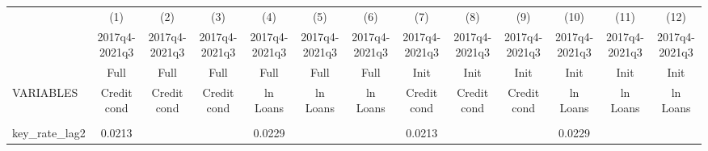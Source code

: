 \documentclass[]{article}
\begin{document}
\begin{center}
\begin{tabular}{lcccccccccccc} \hline
 & (1) & (2) & (3) & (4) & (5) & (6) & (7) & (8) & (9) & (10) & (11) & (12) \\
 & 2017q4-2021q3 & 2017q4-2021q3 & 2017q4-2021q3 & 2017q4-2021q3 & 2017q4-2021q3 & 2017q4-2021q3 & 2017q4-2021q3 & 2017q4-2021q3 & 2017q4-2021q3 & 2017q4-2021q3 & 2017q4-2021q3 & 2017q4-2021q3 \\
 & Full & Full & Full & Full & Full & Full & Init & Init & Init & Init & Init & Init \\
VARIABLES & Credit cond & Credit cond & Credit cond & ln Loans & ln Loans & ln Loans & Credit cond & Credit cond & Credit cond & ln Loans & ln Loans & ln Loans \\ \hline
\vspace{4pt} & \begin{footnotesize}\end{footnotesize} & \begin{footnotesize}\end{footnotesize} & \begin{footnotesize}\end{footnotesize} & \begin{footnotesize}\end{footnotesize} & \begin{footnotesize}\end{footnotesize} & \begin{footnotesize}\end{footnotesize} & \begin{footnotesize}\end{footnotesize} & \begin{footnotesize}\end{footnotesize} & \begin{footnotesize}\end{footnotesize} & \begin{footnotesize}\end{footnotesize} & \begin{footnotesize}\end{footnotesize} & \begin{footnotesize}\end{footnotesize} \\
key\_rate\_lag2 & 0.0213 &  &  & 0.0229 &  &  & 0.0213 &  &  & 0.0229 &  &  \\

\end{tabular}
\end{center}
\end{document}
